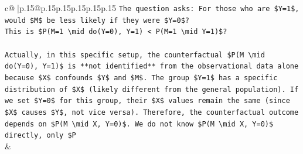 \documentclass{article}
\begin{document}
{\begin{supertabular}{c@{$\;$}|p{.15\linewidth}@{}p{.15\linewidth}p{.15\linewidth}p{.15\linewidth}p{.15\linewidth}p{.15\linewidth}}
{{{\texttt{The question asks: For those who are \$Y=1\$, would \$M\$ be less likely if they were \$Y=0\$?} \\
\texttt{This is \$P(M=1 \textbackslash{}mid do(Y=0), Y=1) < P(M=1 \textbackslash{}mid Y=1)\$?} \\
\\ 
\texttt{Actually, in this specific setup, the counterfactual \$P(M \textbackslash{}mid do(Y=0), Y=1)\$ is **not identified** from the observational data alone because \$X\$ confounds \$Y\$ and \$M\$. The group \$Y=1\$ has a specific distribution of \$X\$ (likely different from the general population). If we set \$Y=0\$ for this group, their \$X\$ values remain the same (since \$X\$ causes \$Y\$, not vice versa). Therefore, the counterfactual outcome depends on \$P(M \textbackslash{}mid X, Y=0)\$. We do not know \$P(M \textbackslash{}mid X, Y=0)\$ directly, only \$P} \\
            }
        }
    }
    & \\ \\

\end{supertabular}
}
\end{document}
